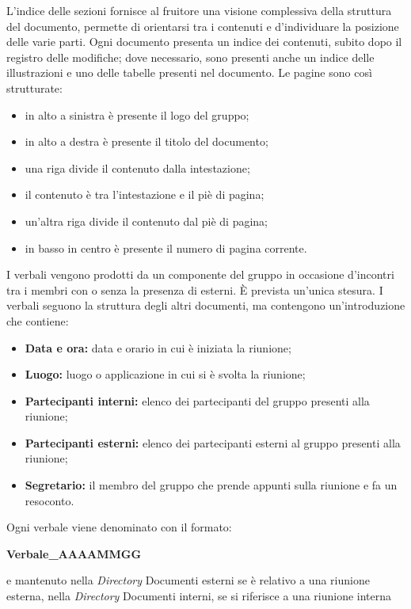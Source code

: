             L’indice delle sezioni fornisce al fruitore una visione complessiva della struttura del documento, permette di orientarsi tra i contenuti e d'individuare la posizione delle varie parti. Ogni documento presenta un indice dei contenuti, subito dopo il registro delle modifiche; dove necessario, sono presenti anche un indice delle illustrazioni e uno delle tabelle presenti nel documento.
            Le pagine sono così strutturate:
            \begin{itemize}
                \item in alto a sinistra è presente il logo del gruppo;
                \item in alto a destra è presente il titolo del documento;
                \item una riga divide il contenuto dalla intestazione;
                \item il contenuto è tra l'intestazione e il piè di pagina;
                \item un'altra riga divide il contenuto dal piè di pagina;
                \item in basso in centro è presente il numero di pagina corrente.
            \end{itemize}
            I verbali vengono prodotti da un componente del gruppo in occasione d'incontri tra i membri con o senza la presenza di esterni. È prevista un'unica stesura. I verbali seguono la struttura degli altri documenti, ma contengono un'introduzione che contiene:
            \begin{itemize}
                \item \textbf{Data e ora:} data e orario in cui è iniziata la riunione;
                \item \textbf{Luogo:} luogo o applicazione in cui si è svolta la riunione;
                \item \textbf{Partecipanti interni:} elenco dei partecipanti del gruppo presenti alla riunione;
                \item \textbf{Partecipanti esterni:} elenco dei partecipanti esterni al gruppo presenti alla riunione; 
                \item \textbf{Segretario:} il membro del gruppo che prende appunti sulla riunione e fa un resoconto.
            \end{itemize}
            Ogni verbale viene denominato con il formato:
            \begin{center}
                \textbf{Verbale\_AAAAMMGG} \\
            \end{center}
            e mantenuto nella \textit{Directory} Documenti esterni se è relativo a una riunione esterna, nella \textit{Directory} Documenti interni, se si riferisce a una riunione interna
